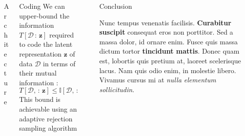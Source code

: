 \documentclass[final]{beamer}
\newlength{\sepwid}
\newlength{\onecolwid}
\newlength{\twocolwid}
\renewcommand{\vec}[1]{\mathbf{#1}}
\newcommand{\D}{\mathcal{D}}
\newcommand{\I}{\mathbb{I}}
\newcommand{\Oh}{\mathcal{O}}
\begin{document}
\begin{frame}[t]
\begin{columns}[t]
\begin{column}{\twocolwid}
\begin{columns}[t,totalwidth=\twocolwid]
\begin{column}{\onecolwid}
\begin{block}{Architecture}
\end{block}


\end{column} %

\begin{column}{\onecolwid} %


\begin{block}{Coding}
  We can upper-bound the information $T[\D \,:\, \vec{z}]$ required to code the
  latent representation $\vec{z}$ of data $\D$ in terms of their mutual
  information \cite{harsha2007communication}:
  \begin{equation}
    T[\D, \,:\, \vec{z}] \leq \I[\D, \,:\, \vec{z}] + 2\log(\I[\D, \,:\, \vec{z}] + 1) + \Oh(1)
  \end{equation}
  This bound is achievable using an adaptive rejection sampling algorithm
\end{block}


\end{column} %

\end{columns} %

\end{column} %

\begin{column}{\sepwid}\end{column} %

\begin{column}{\onecolwid} %


\begin{block}{Conclusion}

Nunc tempus venenatis facilisis. \textbf{Curabitur suscipit} consequat eros non porttitor. Sed a massa dolor, id ornare enim. Fusce quis massa dictum tortor \textbf{tincidunt mattis}. Donec quam est, lobortis quis pretium at, laoreet scelerisque lacus. Nam quis odio enim, in molestie libero. Vivamus cursus mi at \textit{nulla elementum sollicitudin}.


\end{block}
\end{column}
\end{columns}
\end{frame}
\end{document}
